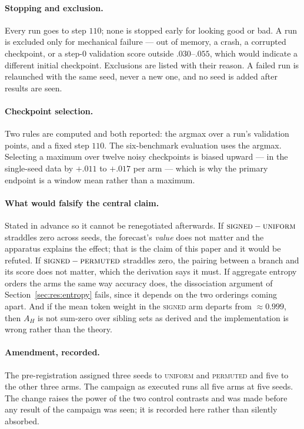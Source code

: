 \documentclass[11pt]{article}
\newcommand{\AH}{A_{H}}
\begin{document}
\paragraph{Stopping and exclusion.} Every run goes to step $110$; none is stopped
early for looking good or bad. A run is excluded only for mechanical failure --- out
of memory, a crash, a corrupted checkpoint, or a step-$0$ validation score outside
$.030$--$.055$, which would indicate a different initial checkpoint. Exclusions are
listed with their reason. A failed run is relaunched with the same seed, never a new
one, and no seed is added after results are seen.

\paragraph{Checkpoint selection.} Two rules are computed and both reported: the
argmax over a run's validation points, and a fixed step $110$. The six-benchmark
evaluation uses the argmax. Selecting a maximum over twelve noisy checkpoints is
biased upward --- in the single-seed data by $+.011$ to $+.017$ per arm --- which is
why the primary endpoint is a window mean rather than a maximum.

\paragraph{What would falsify the central claim.} Stated in advance so it cannot be
renegotiated afterwards. If $\textsc{signed} - \textsc{uniform}$ straddles zero across
seeds, the forecast's \emph{value} does not matter and the apparatus explains the
effect; that is the claim of this paper and it would be refuted. If $\textsc{signed} -
\textsc{permuted}$ straddles zero, the pairing between a branch and its score does
not matter, which the derivation says it must. If aggregate entropy orders the arms
the same way accuracy does, the dissociation argument of
Section~\ref{sec:res:entropy} fails, since it depends on the two orderings coming
apart. And if the mean token weight in the \textsc{signed} arm departs from $\approx 0.999$,
then $\AH$ is not sum-zero over sibling sets as derived and the implementation is
wrong rather than the theory.

\paragraph{Amendment, recorded.} The pre-registration assigned three seeds to
\textsc{uniform} and \textsc{permuted} and five to the other three arms. The campaign
as executed runs all five arms at five seeds. The change raises the power of the two
control contrasts and was made before any result of the campaign was seen; it is
recorded here rather than silently absorbed.
\end{document}
